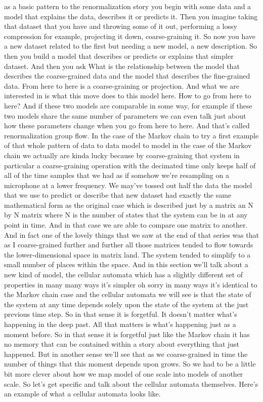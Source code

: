 \documentclass[]{article}
\begin{document}
as a basic pattern
to the renormalization story
you begin with some data
and a model
that explains
the data,
describes it
or predicts it.
Then you imagine
taking that dataset that you have
and throwing some of it out,
performing a lossy compression
for example,
projecting it down,
coarse-graining it.
So now you have a new dataset
related to the first
but needing a new model,
a new description.
So then you build a model
that describes
or predicts
or explains
that simpler dataset.
And then you ask
What is the relationship
between the model
that describes the coarse-grained data
and the model
that describes
the fine-grained data.
From here
to here
is a coarse-graining
or projection.
And what we are interested in
is what this move
does to this model here.
How to go from here
to here?
And if these two models
are comparable in some way,
for example if these two models
share the same number of parameters
we can even talk
just about how these parameters change
when you go from here
to here.
And that's called
renormalization group flow.
In the case of the Markov chain
to try a first example
of that whole pattern
of data
to data
model
to model
in the case of the Markov chain
we actually
are kinda lucky
because by coarse-graining that system
in particular
a coarse-graining operation
with the decimated time
only keeps half of all of the time samples
that we had
as if somehow
we're resampling
on a microphone
at a lower frequency.
We may've tossed out
half the data
the model that we use
to predict
or describe
that new dataset
had exactly the same
mathematical form
as the original case
which is described just by a matrix
an N by N matrix
where N is the number of states
that the system can be in
at any point in time.
And in that case we are able
to compare one matrix to another.
And in fact
one of the lovely things
that we saw at the end of that
series
was that as I
coarse-grained
further and further
all those matrices
tended to flow towards
the lower-dimensional space
in matrix land.
The system tended to simplify
to a small number of places
within the space.
And in this section
we'll talk about a new kind of model,
the cellular automata
which has a slightly
different set of properties
in many many ways it's simpler
oh sorry
in many ways it's identical
to the Markov chain case
and the cellular automata
we will see
is that the state of the system
at any time
depends solely
upon the state of the system
at the just previous time step.
So in that sense it is forgetful.
It doesn't matter
what's happening
in the deep past.
All that matters is
what's happening just as a moment before.
So in that sense it is
forgetful just like the Markov chain
it has no memory
that can be contained
within
a story about everything
that just happened.
But in another sense we'll see
that as we coarse-grained in time
the number of things that this moment
depends upon
grows.
So we had to be a little bit more clever
about how we map
model of one scale
into models
of another scale.
So let's get
specific
and talk about the cellular automata
themselves.
Here's an example
of what a cellular automata
looks like.
\end{document}
